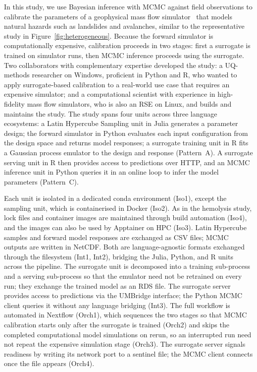 \documentclass{eceasst}
\begin{document}
In this study, we use Bayesian inference with MCMC against field observations
to calibrate the parameters of a geophysical mass flow simulator~\cite{zhao2023psimpy,mergili2025ravaflow,oesterle2026avaframe}
that models natural hazards such as landslides and avalanches, similar to the representative study in Figure~\ref{fig:heterogeneous}.
Because the forward simulator is computationally expensive, calibration proceeds
in two stages: first a surrogate is trained on simulator runs, then MCMC inference proceeds
using the surrogate.
Two collaborators with complementary expertise developed the study: a UQ-methods
researcher on Windows, proficient in Python and R, who wanted to apply
surrogate-based calibration to a real-world use case that requires an expensive
simulator; and a computational scientist with experience in high-fidelity mass
flow simulators, who is also an RSE on Linux, and builds and maintains the study.
The study spans four units across three language ecosystems: a Latin Hypercube
Sampling unit in Julia generates a parameter design; the forward simulator in
Python evaluates each input configuration from the design space and returns
model responses; a surrogate training unit in R fits a Gaussian process emulator
to the design and response (Pattern~A).
A surrogate serving unit in R then provides access to predictions over HTTP, and an MCMC
inference unit in Python queries it in an online loop to infer the model
parameters (Pattern~C).

Each unit is isolated in a dedicated conda environment (Iso1), except the
sampling unit, which is containerised in Docker (Iso2). As in the hemolysis
study, lock files and container images are maintained through
build automation (Iso4), and the images can also be used by Apptainer on HPC (Iso3).
Latin Hypercube samples and forward model responses are exchanged as CSV files;
MCMC outputs are written in NetCDF.
Both are language-agnostic formats exchanged through the filesystem (Int1,
Int2), bridging the Julia, Python, and R units across the pipeline.
The surrogate unit is decomposed into a training sub-process and a serving
sub-process so that the emulator need not be retrained on every run; they
exchange the trained model as an RDS file.
The surrogate server provides access to predictions via the UMBridge
interface; the Python MCMC client queries it without any language bridging
(Int3).
The full workflow is automated in Nextflow (Orch1), which sequences the two
stages so that MCMC calibration starts only after the surrogate is trained
(Orch2) and skips the completed computational model simulations on rerun, so an
interrupted run need not repeat the expensive simulation stage (Orch3).
The surrogate server signals readiness by writing its network port to a sentinel
file; the MCMC client connects once the file appears (Orch4).
\end{document}
